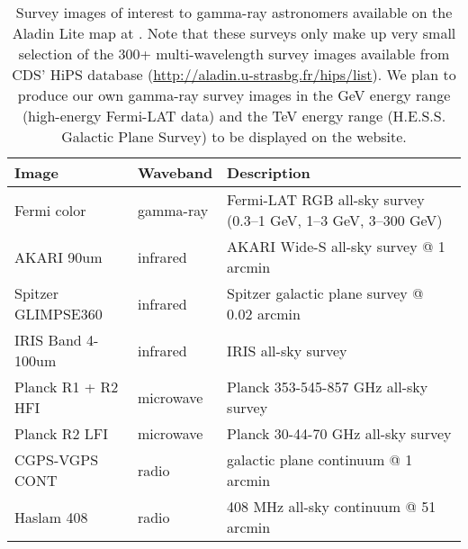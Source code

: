 \begin{table}[bt]

\caption{
Survey images of interest to gamma-ray astronomers available on the Aladin Lite map at \gammasky . Note that these surveys only make up very small selection of the 300+ multi-wavelength survey images available from CDS' HiPS database (\protect\url{http://aladin.u-strasbg.fr/hips/list}). We plan to produce our own gamma-ray survey images in the GeV energy range (high-energy Fermi-LAT data) and the TeV energy range (H.E.S.S. Galactic Plane Survey) to be displayed on the website.
}

\label{tab:images}
\begin{tabular}{ lll }
\hline
Image              & Waveband  & Description\\
\hline
Fermi color        & gamma-ray & Fermi-LAT RGB all-sky survey (0.3--1 GeV, 1--3 GeV, 3--300 GeV) \\
AKARI 90um         & infrared  & AKARI Wide-S all-sky survey @ 1 arcmin\\
Spitzer GLIMPSE360 & infrared  & Spitzer galactic plane survey @ 0.02 arcmin\\
IRIS Band 4-100um  & infrared  & IRIS all-sky survey\\
Planck R1 + R2 HFI & microwave & Planck 353-545-857 GHz all-sky survey\\
Planck R2 LFI      & microwave & Planck 30-44-70 GHz all-sky survey\\
CGPS-VGPS CONT     & radio     & galactic plane continuum @ 1 arcmin\\
Haslam 408         & radio     & 408 MHz all-sky continuum @ 51 arcmin\\
\hline
\end{tabular}

\end{table}
